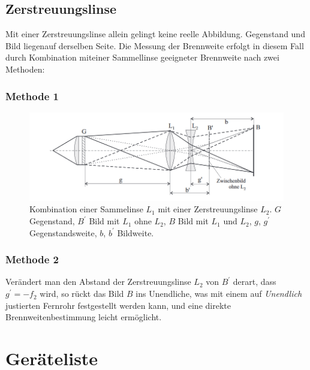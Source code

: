 \documentclass{article}
\begin{document}
\subsection{Zerstreuungslinse}

Mit einer Zerstreuungslinse allein gelingt keine reelle Abbildung. Gegenstand und Bild liegenauf derselben Seite. Die Messung der Brennweite erfolgt in diesem Fall durch Kombination miteiner Sammellinse geeigneter Brennweite nach zwei Methoden:


\subsubsection{Methode 1}
\label{sec:zerstr_methode1}



\begin{figure}[H]
\centering
\includegraphics[scale=0.5]{zerstreuungslinse.png}
\caption{Kombination einer Sammelinse $L_1$ mit einer Zerstreuungslinse $L_2$. $G$ Gegenstand, $B^\prime$ Bild mit $L_1$ ohne $L_2$, $B$ Bild mit $L_1$ und $L_2$, $g$, $g^\prime$ Gegenstandsweite, $b$, $b^\prime$ Bildweite.}
\label{fig:zerstreuungslinse}
\end{figure}


\subsubsection{Methode 2}
Verändert man den Abstand der Zerstreuungslinse $L_2$ von $B^\prime$ derart, dass $g^\prime = -f_2$ wird, so rückt das Bild $B$ ins Unendliche, was mit einem auf \textit{Unendlich} justierten Fernrohr festgestellt werden kann, und eine direkte Brennweitenbestimmung leicht ermöglicht.

\newpage

\section{Geräteliste}
\end{document}
